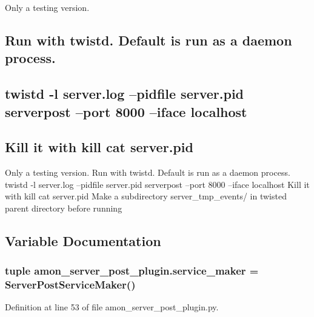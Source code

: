 Only a testing version. \subsection*{Run with twistd. Default is run as a daemon process.}

\subsection*{twistd -\/l server.\-log --pidfile server.\-pid serverpost --port 8000 --iface localhost}

\subsection*{Kill it with kill {\ttfamily cat server.\-pid}}

Only a testing version. Run with twistd. Default is run as a daemon process. twistd -\/l server.\-log --pidfile server.\-pid serverpost --port 8000 --iface localhost Kill it with kill {\ttfamily cat server.\-pid} Make a subdirectory server\-\_\-tmp\-\_\-events/ in twisted parent directory before running 

\subsection{Variable Documentation}
\hypertarget{namespaceamon__server__post__plugin_a160c925c1d06e7c9ae70e1359c0f6cbe}{
\subsubsection[{service\-\_\-maker}]{\setlength{\rightskip}{0pt plus 5cm}tuple amon\-\_\-server\-\_\-post\-\_\-plugin.\-service\-\_\-maker = {\bf Server\-Post\-Service\-Maker}()}}\label{namespaceamon__server__post__plugin_a160c925c1d06e7c9ae70e1359c0f6cbe}


Definition at line 53 of file amon\-\_\-server\-\_\-post\-\_\-plugin.\-py.

